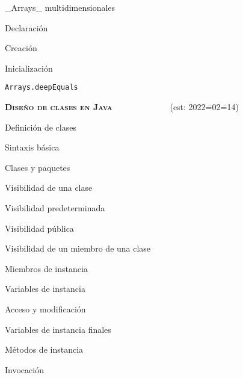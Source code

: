 \begin{longenum}
\begin{longenum}
\begin{longenum}
\begin{longenum}
            \end{longenum}
            \item \_Arrays\_ multidimensionales
            \begin{longenum}
                \item Declaración
                \item Creación
                \item Inicialización
                \item \texttt{Arrays.deepEquals}
            \end{longenum}
        \end{longenum}
    \end{longenum}
    \item \textbf{\textsc{Diseño de clases en Java}} \ \ \ \ \ \ \ \ \ \ \ \ \ (est: 2022\==02\==14)
    \begin{longenum}
        \item Definición de clases
        \begin{longenum}
            \item Sintaxis básica
            \item Clases y paquetes
            \item Visibilidad de una clase
            \begin{longenum}
                \item Visibilidad predeterminada
                \item Visibilidad pública
            \end{longenum}
            \item Visibilidad de un miembro de una clase
        \end{longenum}
        \item Miembros de instancia
        \begin{longenum}
            \item Variables de instancia
            \begin{longenum}
                \item Acceso y modificación
                \item Variables de instancia finales
            \end{longenum}
            \item Métodos de instancia
            \begin{longenum}
                \item Invocación

\end{longenum}
\end{longenum}
\end{longenum}
\end{longenum}
